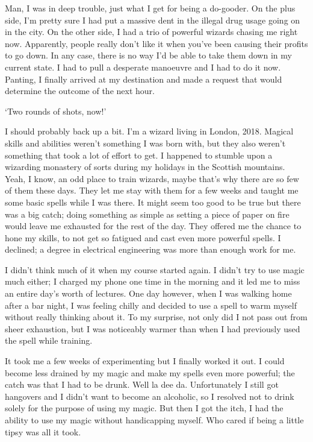 Man, I was in deep trouble, just what I get for being a do-gooder. On the plus side, I'm pretty sure I had put a massive dent in the illegal drug usage going on in the city. On the other side, I had a trio of powerful wizards chasing me right now. Apparently, people really don't like it when you've been causing their profits to go down. In any case, there is no way I'd be able to take them down in my current state. I had to pull a desperate manoeuvre and I had to do it now. Panting, I finally arrived at my destination and made a request that would determine the outcome of the next hour.

`Two rounds of shots, now!'

I should probably back up a bit. I'm a wizard living in London, 2018. Magical skills and abilities weren't something I was born with, but they also weren't something that took a lot of effort to get. I happened to stumble upon a wizarding monastery of sorts during my holidays in the Scottish mountains. Yeah, I know, an odd place to train wizards, maybe that's why there are so few of them these days. They let me stay with them for a few weeks and taught me some basic spells while I was there. It might seem too good to be true but there was a big catch; doing something as simple as setting a piece of paper on fire would leave me exhausted for the rest of the day. They offered me the chance to hone my skills, to not get so fatigued and cast even more powerful spells. I declined; a degree in electrical engineering was more than enough work for me.

I didn't think much of it when my course started again. I didn't try to use magic much either; I charged my phone one time in the morning and it led me to miss an entire day's worth of lectures. One day however, when I was walking home after a bar night, I was feeling chilly and decided to use a spell to warm myself without really thinking about it. To my surprise, not only did I not pass out from sheer exhaustion, but I was noticeably warmer than when I had previously used the spell while training.

It took me a few weeks of experimenting but I finally worked it out. I could become less drained by my magic and make my spells even more powerful; the catch was that I had to be drunk. Well la dee da. Unfortunately I still got hangovers and I didn't want to become an alcoholic, so I resolved not to drink solely for the purpose of using my magic. But then I got the itch, I had the ability to use my magic without handicapping myself. Who cared if being a little tipsy was all it took.

